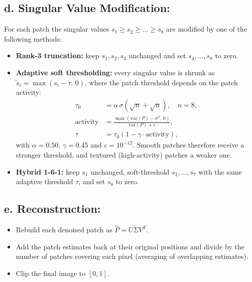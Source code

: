 \documentclass{article}
\begin{document}
\begin{flushleft}
\subsection*{d. Singular Value Modification:}
For each patch the singular values $s_1 \geq s_2 \geq \dots \geq s_8$ are modified by one of the following methods:
\begin{itemize}
    \item \textbf{Rank-3 truncation:} keep $s_1, s_2, s_3$ unchanged and set $s_4, \dots, s_8$ to zero.
    \item \textbf{Adaptive soft thresholding:} every singular value is shrunk as $\tilde{s}_i = \max(s_i - \tau,\, 0)$, where the patch threshold depends on the patch activity:
    \begin{align*}
        \tau_0 &= \alpha \, \sigma \left(\sqrt{n} + \sqrt{n}\right), \quad n = 8, \\
        \text{activity} &= \frac{\max(\mathrm{var}(P) - \sigma^2,\, 0)}{\mathrm{var}(P) + \epsilon}, \\
        \tau &= \tau_0 \left(1 - \gamma \cdot \text{activity}\right),
    \end{align*}
    with $\alpha = 0.50$, $\gamma = 0.45$ and $\epsilon = 10^{-12}$. Smooth patches therefore receive a stronger threshold, and textured (high-activity) patches a weaker one.
    \item \textbf{Hybrid 1-6-1:} keep $s_1$ unchanged, soft-threshold $s_2, \dots, s_7$ with the same adaptive threshold $\tau$, and set $s_8$ to zero.
\end{itemize}

\subsection*{e. Reconstruction:}
\begin{itemize}
    \item Rebuild each denoised patch as $\hat{P} = U \tilde{\Sigma} V^{T}$.
    \item Add the patch estimates back at their original positions and divide by the number of patches covering each pixel (averaging of overlapping estimates).
    \item Clip the final image to $[0, 1]$.
\end{itemize}


\end{flushleft}
\end{document}
